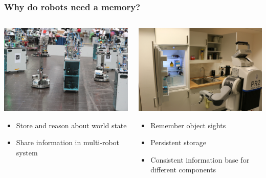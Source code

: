 \begin{frame}
  \frametitle{Why do robots need a memory?}
  \vspace{1cm}
  \begin{columns}
    \begin{column}{0.5\textwidth}
    \includegraphics[width=\textwidth]{../thesis/img/rcll-feld}
    \begin{itemize}
    \item Store and reason about world state
    \item Share information in multi-robot system
    \end{itemize}
    \end{column}
    \begin{column}{0.5\textwidth}
    \includegraphics[width=\textwidth]{../thesis/img/pr2-kbsg-kitchen}
    \begin{itemize}
    \item Remember object sights
    \item Persistent storage
    \item Consistent information base for different components
    \end{itemize}
    \end{column}
  \end{columns}
\end{frame}

